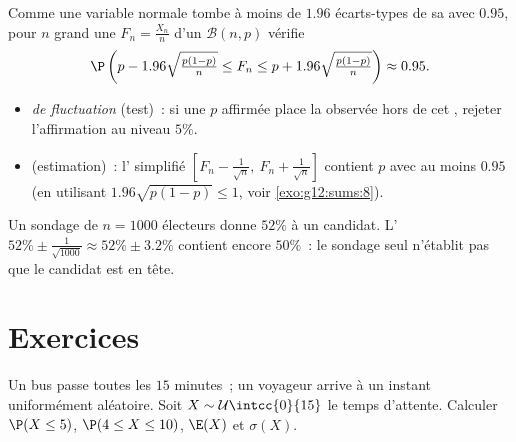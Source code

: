 \begin{method}\label{met:g12:contdist:fluctuation}
Comme une variable normale tombe à moins de $1.96$ écarts-types de sa
 avec  $0.95$, pour $n$ grand une 
$F_n = \frac{X_n}{n}$ d'un  $\mathcal B(n,p)$ vérifie
\[
\P\left(p - 1.96\sqrt{\tfrac{p(1-p)}{n}} \leq F_n \leq
p + 1.96\sqrt{\tfrac{p(1-p)}{n}}\right) \approx 0.95 .
\]
\begin{itemize}
  \item \emph{ de fluctuation} (test)~: si une $p$ affirmée place
        la  observée hors de cet , rejeter l'affirmation
        au niveau $5\%$.
  \item \emph{} (estimation)~: l'
        simplifié
        $\left[F_n - \frac{1}{\sqrt n},\ F_n + \frac{1}{\sqrt n}\right]$
        contient $p$ avec  au moins $0.95$
        (en utilisant $1.96\sqrt{p(1-p)} \leq 1$, voir
        \cref{exo:g12:sums:8}).
\end{itemize}
\end{method}

\begin{example}\label{ex:g12:contdist:poll}
Un sondage de $n = 1000$ électeurs donne $52\%$ à un candidat. L' $52\% \pm \frac{1}{\sqrt{1000}} \approx 52\% \pm 3.2\%$ contient
encore $50\%$~: le sondage seul n'établit pas que le candidat est en tête.
\end{example}

\section{Exercices}

\begin{exercise}[$\star$]\label{exo:g12:contdist:1}
Un bus passe toutes les $15$ minutes~; un voyageur arrive à un instant
uniformément aléatoire. Soit $X \sim \mathcal U\intcc{0}{15}$ le temps
d'attente. Calculer $\P(X \leq 5)$, $\P(4 \leq X \leq 10)$, $\E(X)$ et
$\sigma(X)$.
\end{exercise}


